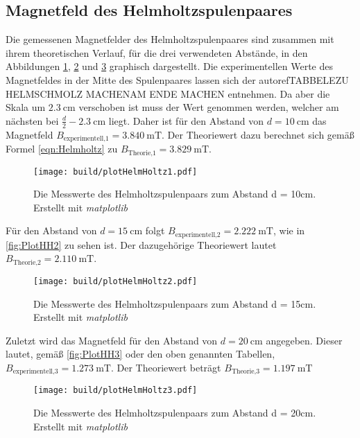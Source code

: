 \subsection{Magnetfeld des Helmholtzspulenpaares}
\label{subsec:A_Helmholtz}
Die gemessenen Magnetfelder des Helmholtzspulenpaares sind zusammen mit ihrem theoretischen Verlauf, für die drei verwendeten Abstände, in den Abbildungen \ref{fig:PlotHH1}, \ref{fig:PlotHH2} und \ref{fig:PlotHH3} 
graphisch dargestellt. Die experimentellen Werte des Magnetfeldes in der Mitte des Spulenpaares lassen sich der autoref{TABBELEZU HELMSCHMOLZ MACHENAM ENDE MACHEN} entnehmen. Da aber die Skala um $2.3\:\unit{\centi\metre}$ verschoben ist muss der Wert
genommen werden, welcher am nächsten bei $\frac{d}{2} - 2.3\:\unit{\centi\metre}$ liegt. Daher ist für den Abstand von $d = 10\:\unit{\centi\metre}$ das Magnetfeld $B_{\text{experimentell,1}} = 3.840\:\unit{\milli\tesla}$.
Der Theoriewert dazu berechnet sich gemäß Formel \eqref{eqn:Helmholtz} zu $B_{\text{Theorie,1}} = 3.829\:\unit{\milli\tesla}$.
\begin{figure}[H]
    \centering
    \caption{Die Messwerte des Helmholtzspulenpaars zum Abstand d = 10cm. Erstellt mit \textit{matplotlib} \cite{matplotlib}}
    \label{fig:PlotHH1}
    \texttt{[image: build/plotHelmHoltz1.pdf]}
\end{figure}
Für den Abstand von $d = 15\:\unit{\centi\metre}$ folgt $B_{\text{experimentell,2}} = 2.222\:\unit{\milli\tesla}$, wie in \autoref{fig:PlotHH2} zu sehen ist. Der dazugehörige Theoriewert lautet $B_{\text{Theorie,2}} = 2.110\:\unit{\milli\tesla}$.
\begin{figure}[H]
    \centering
    \caption{Die Messwerte des Helmholtzspulenpaars zum Abstand d = 15cm. Erstellt mit \textit{matplotlib} \cite{matplotlib}}
    \label{fig:PlotHH2}
    \texttt{[image: build/plotHelmHoltz2.pdf]}
\end{figure}
Zuletzt wird das Magnetfeld für den Abstand von $d = 20\:\unit{\centi\metre}$ angegeben. Dieser lautet, gemäß \autoref{fig:PlotHH3} oder den oben genannten Tabellen, $B_{\text{experimentell,3}} = 1.273\:\unit{\milli\tesla}$. Der Theoriewert beträgt $B_{\text{Theorie,3}} = 1.197\:\unit{\milli\tesla}$
\begin{figure}[H]
    \centering
    \caption{Die Messwerte des Helmholtzspulenpaars zum Abstand d = 20cm. Erstellt mit \textit{matplotlib} \cite{matplotlib}}
    \label{fig:PlotHH3}
    \texttt{[image: build/plotHelmHoltz3.pdf]}
\end{figure}
